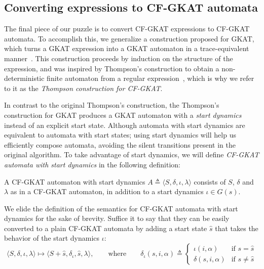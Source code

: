 \subsection{Converting expressions to CF-GKAT automata}

The final piece of our puzzle is to convert CF-GKAT expressions to CF-GKAT automata.
To accomplish this, we generalize a construction proposed for GKAT, which turns a GKAT expression into a GKAT automaton in a trace-equivalent manner~\cite{Smolka_Foster_Hsu_Kappé_Kozen_Silva_2020}.
This construction proceeds by induction on the structure of the expression, and was inspired by Thompson's construction to obtain a non-deterministic finite automaton from a regular expression~\cite{thompson_ProgrammingTechniquesRegular_1968}, which is why we refer to it as the \emph{Thompson construction for CF-GKAT}.

In contrast to the original Thompson's construction, the Thompson's construction for GKAT produces a GKAT automaton with a \emph{start dynamics} instead of an explicit start state. 
Although automata with start dynamics are equivalent to automata with start states; using start dynamics will help us efficiently compose automata, avoiding the silent transitions present in the original algorithm.
To take advantage of start dynamics, we will define \emph{CF-GKAT automata with start dynamics} in the following definition:

\begin{definition}
 A CF-GKAT automaton with start dynamics \(A ≜ ⟨S, δ, ι, λ⟩\) consists of $S$, $δ$ and $λ$ as in a CF-GKAT automaton, in addition to a start dynamics \(ι ∈ G(s)\).
\end{definition}

We elide the definition of the semantics for CF-GKAT automata with start dynamics for the sake of brevity.
Suffice it to say that they can be easily converted to a plain CF-GKAT automata by adding a start state \(\hat{s}\) that takes the behavior of the start dynamics \(ι\):
\begin{equation}\label{cons: CF-GKAT pseudo start to CF-GKAT automata}
 ⟨S, δ, ι, λ⟩ ↦ ⟨S + \hat{s}, δ_ι, \hat{s}, λ⟩,
 \qquad
 \text{where}
 \qquad
 δ_ι(s, i, α) ≜
 \begin{cases}
  ι(i, α)    & \text{if } s = \hat{s} \\
  δ(s, i, α) & \text{if } s ≠ \hat{s}
 \end{cases}
\end{equation}

